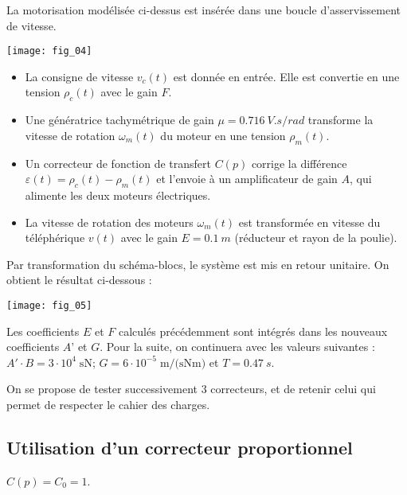 
La motorisation modélisée ci-dessus est insérée dans une boucle d’asservissement de vitesse.

\begin{marginfigure}
	\texttt{[image: fig\_04]}
\end{marginfigure}

\begin{itemize}
\item La consigne de vitesse $v_c(t)$ est donnée en entrée. Elle est convertie en une tension $\rho_c(t)$ avec le gain $F$.
\item Une génératrice tachymétrique de gain $\mu=\SI{0.716}{V.s/rad}$ transforme la vitesse de rotation $\omega_m(t)$ du moteur en une tension $\rho_m(t)$.
\item Un correcteur de fonction de transfert $C(p)$ corrige la différence $\varepsilon(t)=\rho_c(t)- \rho_m(t)$ et l’envoie à un amplificateur de gain $A$, qui alimente les deux moteurs électriques.
\item La vitesse de rotation des moteurs $\omega_m(t)$ est transformée en vitesse du téléphérique $v(t)$ avec le gain $E=\SI{0,1}{m}$ (réducteur et rayon de la poulie).
\end{itemize}




Par transformation du schéma-blocs, le système est mis en retour unitaire. On obtient le résultat ci-dessous :
\begin{center}
	\texttt{[image: fig\_05]}
\end{center}

	Les coefficients $E$ et $F$ calculés précédemment sont intégrés dans les nouveaux coefficients $A’$ et $G$. Pour la suite, on continuera avec les valeurs suivantes : $A'\cdot B=3\cdot 10^{4}\;\text{sN}$; $G=6\cdot 10^{-5}\;\text{m/(sNm)}$ et $T=\SI{0,47}{s}$.
	
	
On se propose de tester successivement 3 correcteurs, et de retenir celui qui permet de respecter le cahier des charges.

\subsection*{Utilisation d'un correcteur proportionnel}
$C(p)=C_0=1$.


